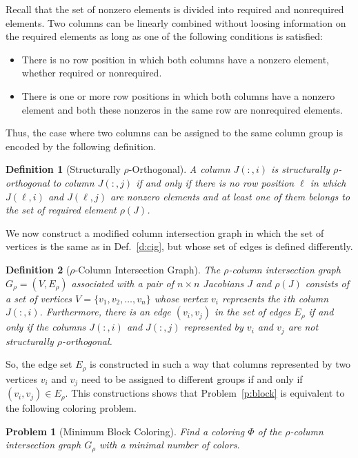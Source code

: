 \documentclass[12pt, oneside]{book}
\newtheorem{problem}{Problem}
\newtheorem{definition}{Definition}
\newcommand{\sparsifysymbol}{\ensuremath{\rho}}
\newcommand{\sparsify}[1]{\ensuremath{\sparsifysymbol(#1)}}
\begin{document}
Recall that the set of nonzero elements is divided into required and nonrequired
elements. Two columns can be linearly combined without loosing information on the
required elements as long as one of the following conditions is satisfied:
\begin{itemize}
  \item There is no row position in which both columns have a nonzero element, whether
      required or nonrequired.
  \item There is one or more row positions in which both columns have a nonzero element
      and both these nonzeros in the same row are nonrequired elements.
\end{itemize}

Thus, the case where two columns can be assigned to the same column group is encoded by
the following definition.

\begin{definition}[Structurally $\sparsifysymbol$-Orthogonal]
A column $J(:,i)$ is structurally $\sparsifysymbol$-orthogonal to column $J(:,j)$ if and
only if there is no row position $\ell$ in which $J(\ell,i)$ and $J(\ell,j)$ are nonzero
elements and at least one of them belongs to the set of required element \sparsify{J}.
\end{definition}

We now construct a modified column intersection graph in which the set of vertices is the
same as in Def.~\ref{d:cig}, but whose set of edges is defined differently.
%
\begin{definition}[$\sparsifysymbol$-Column Intersection Graph]
The $\sparsifysymbol$-column intersection graph $G_\sparsifysymbol =
(V,E_\sparsifysymbol)$ associated with a pair of $n \times n$ Jacobians $J$ and
\sparsify{J} consists of a set of vertices $V=\{v_1, v_2, \dots, v_n\}$ whose vertex
$v_i$ represents the $i$th column $J(:,i)$. Furthermore, there is an edge $(v_i,v_j)$ in
the set of edges $E_\sparsifysymbol$ if and only if the columns $J(:,i)$ and $J(:,j)$
represented by $v_i$ and $v_j$ are not structurally $\sparsifysymbol$-orthogonal.
\end{definition}

So, the edge set $E_\sparsifysymbol$ is constructed in such a way that columns
represented by two vertices $v_i$ and $v_j$ need to be assigned to different groups if
and only if $(v_i, v_j) \in E_\sparsifysymbol$. This constructions shows that
Problem~\ref{p:block} is equivalent to the following coloring problem.
%
\begin{problem}[Minimum Block Coloring]
\label{p:minblockcol}
%
Find a coloring $\Phi$ of the $\sparsifysymbol$-column intersection graph
$G_\sparsifysymbol$ with a minimal number of colors.
\end{problem}
\end{document}
